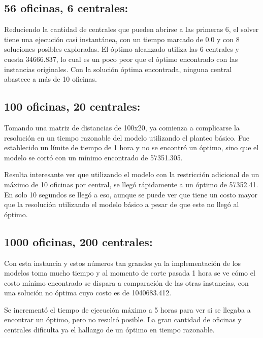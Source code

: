 \documentclass{article}
\begin{document}
\subsection*{56 oficinas, 6 centrales:}
Reduciendo la cantidad de centrales que pueden abrirse a las primeras 6, el solver tiene una ejecución casi instantánea, con un tiempo marcado de 0.0 y con 8 soluciones posibles exploradas. El óptimo alcanzado utiliza las 6 centrales y cuesta 34666.837, lo cual es un poco peor que el óptimo encontrado con las instancias originales. Con la solución óptima encontrada, ninguna central abastece a más de 10 oficinas.

\subsection*{100 oficinas, 20 centrales:}
Tomando una matriz de distancias de 100x20, ya comienza a complicarse la resolución en un tiempo razonable del modelo utilizando el planteo básico. Fue establecido un límite de tiempo de 1 hora y no se encontró un óptimo, sino que el modelo se cortó con un mínimo encontrado de 57351.305.

Resulta interesante ver que utilizando el modelo con la restricción adicional de un máximo de 10 oficinas por central, se llegó rápidamente a un óptimo de 57352.41. En solo 10 segundos se llegó a eso, aunque se puede ver que tiene un costo mayor que la resolución utilizando el modelo básico a pesar de que este no llegó al óptimo.

\subsection*{1000 oficinas, 200 centrales:}
Con esta instancia y estos números tan grandes ya la implementación de los modelos toma mucho tiempo y al momento de corte pasada 1 hora se ve cómo el costo mínimo encontrado se dispara a comparación de las otras instancias, con una solución no óptima cuyo costo es de 1040683.412.

Se incrementó el tiempo de ejecución máximo a 5 horas para ver si se llegaba a encontrar un óptimo, pero no resultó posible. La gran cantidad de oficinas y centrales dificulta ya el hallazgo de un óptimo en tiempo razonable.
\end{document}
